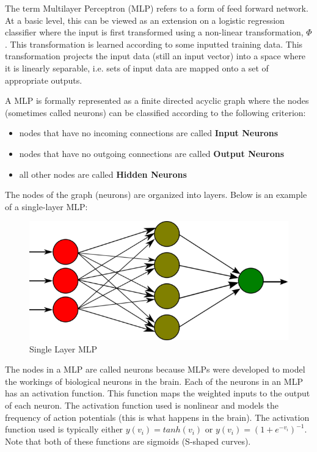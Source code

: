 \documentclass[12pt, titlepage]{article}
\begin{document}
  The term Multilayer Perceptron (MLP) refers to a form of feed forward network. At a basic level, this can be viewed
  as an extension on a logistic regression classifier where the input is first transformed using a non-linear 
  transformation, $\Phi$. This transformation is learned according to some inputted training data. This transformation
  projects the input data (still an input vector) into a space where it is linearly separable, i.e. sets of input data are
  mapped onto a set of appropriate outputs.
  
  A MLP is formally represented as a finite directed acyclic graph where the nodes (sometimes called neurons) can be
  classified according to the following criterion:
  \begin{itemize}
    \item nodes that have no incoming connections are called \textbf{Input Neurons}
    \item nodes that have no outgoing connections are called \textbf{Output Neurons}
    \item all other nodes are called \textbf{Hidden Neurons}
  \end{itemize}
  The nodes of the graph (neurons) are organized into layers. Below is an example of a single-layer MLP:
  \FloatBarrier
  \begin{figure}[h]
    \caption{Single Layer MLP}
    \centering
    \includegraphics[scale=0.3]{images/single_layer_mlp_example}
  \end{figure}
  \FloatBarrier
  
  The nodes in a MLP are called neurons because MLPs were developed to model the workings of biological neurons in the
  brain. Each of the neurons in an MLP has an activation function. This function maps the weighted inputs to the output of
  each neuron. The activation function used is nonlinear and models the frequency of action potentials (this is what happens
  in the brain). The activation function used is typically either $y(v_{i}) = tanh(v_{i})$ or $y(v_{i}) = (1 + e^{-v_{i}})^{-1}$.
  Note that both of these functions are sigmoids (S-shaped curves).
  
\end{document}
